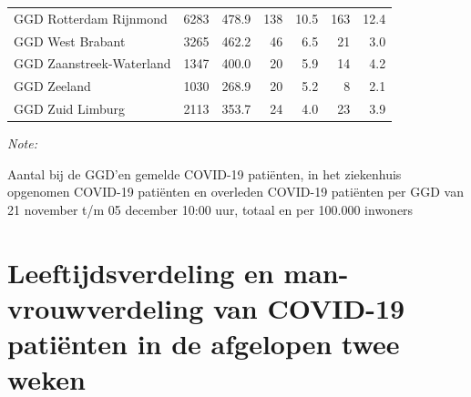 \documentclass[
  english,
  man,floatsintext]{apa6}
\begin{document}
\begin{table}[H]
\begin{threeparttable}
\begin{tabular}{lrrrrrr}
GGD Rotterdam Rijnmond & 6283 & 478.9 & 138 & 10.5 & 163 & 12.4\\
GGD West Brabant & 3265 & 462.2 & 46 & 6.5 & 21 & 3.0\\
GGD Zaanstreek-Waterland & 1347 & 400.0 & 20 & 5.9 & 14 & 4.2\\
GGD Zeeland & 1030 & 268.9 & 20 & 5.2 & 8 & 2.1\\
GGD Zuid Limburg & 2113 & 353.7 & 24 & 4.0 & 23 & 3.9\\
\bottomrule
\end{tabular}
\begin{tablenotes}
\item \textit{Note: } 
\item Aantal bij de GGD’en gemelde COVID-19 patiënten, in het ziekenhuis opgenomen COVID-19 patiënten en overleden COVID-19 patiënten per GGD van 21 november t/m 05 december 10:00 uur, totaal en per 100.000 inwoners
\end{tablenotes}
\end{threeparttable}
\endgroup{}
\end{table}

\newpage

\hypertarget{leeftijdsverdeling-en-man-vrouwverdeling-van-covid-19-patiuxebnten-in-de-afgelopen-twee-weken}{%
\section{Leeftijdsverdeling en man-vrouwverdeling van COVID-19 patiënten in de afgelopen twee weken}\label{leeftijdsverdeling-en-man-vrouwverdeling-van-covid-19-patiuxebnten-in-de-afgelopen-twee-weken}}
\end{document}

